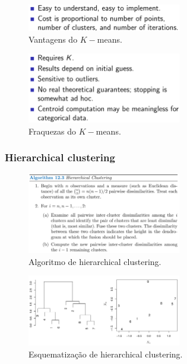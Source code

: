 \documentclass[a4paper,fleqn,12pt]{article}
\begin{document}
\begin{figure}[H]
\centering
\includegraphics[width=0.6\textwidth]{fig/k-means_strengths.png}
\caption{Vantagens do $K-$means.}
\label{fig:k-means_strengths}
\end{figure}

\begin{figure}[H]
\centering
\includegraphics[width=0.6\textwidth]{fig/k-means_weaknesses.png}
\caption{Fraquezas do $K-$means.}
\label{fig:k-means_weaknesses}
\end{figure}


\subsubsection{Hierarchical clustering}

\begin{figure}[H]
\centering
\includegraphics[width=0.6\textwidth]{fig/hierarchical_algo.png}
\caption{Algoritmo de hierarchical clustering.}
\label{fig:hierarchical_algo}
\end{figure}

\begin{figure}[H]
\centering
\includegraphics[width=0.6\textwidth]{fig/hierarchical_scheme.png}
\caption{Esquematização de hierarchical clustering.}
\label{fig:hierarchical_scheme}
\end{figure}
\end{document}
